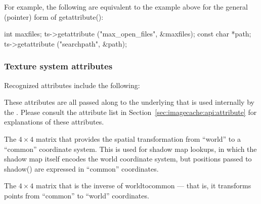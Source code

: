 For example, the following are equivalent to the example above for the
general (pointer) form of {\cf getattribute()}:

\begin{code}
      int maxfiles;
      ts->getattribute ("max_open_files", &maxfiles);
      const char *path;
      ts->getattribute ("searchpath", &path);
\end{code}

\apiend


\subsubsection*{Texture system attributes}
\label{sec:texturesys:attributes}

Recognized attributes include the following:


These attributes are all passed along to the underlying \ImageCache that
is used internally by the \TextureSystem.  Please consult the
\ImageCache attribute list in Section~\ref{sec:imagecache:api:attribute}
for explanations of these attributes.

\apiend

The $4 \times 4$ matrix that provides the spatial transformation
from ``world'' to a ``common'' coordinate system.  This is used for
shadow map lookups, in which the shadow map itself encodes the
world coordinate system, but positions passed to {\cf shadow()} are
expressed in ``common'' coordinates.
\apiend

The $4 \times 4$ matrix that is the inverse of {\cf worldtocommon} ---
that is, it transforms points from ``common'' to ``world'' coordinates.

